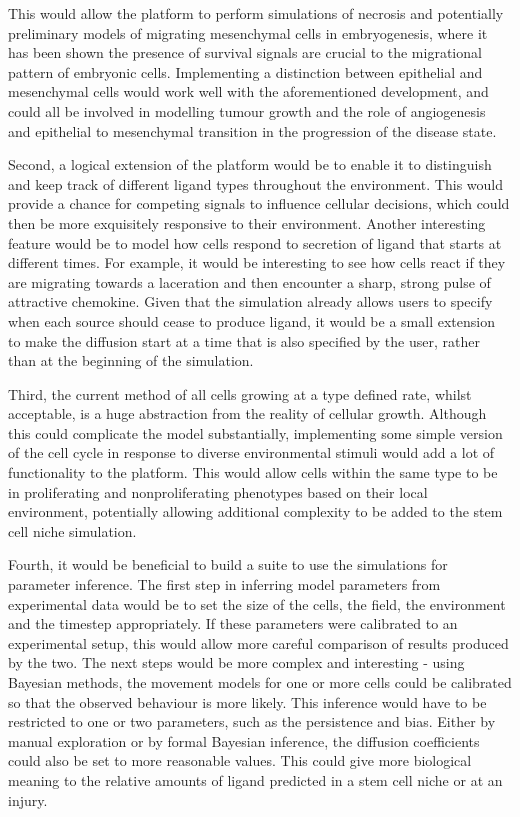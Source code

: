 \documentclass[12pt]{article}
\begin{document}
This would allow the platform to perform simulations of necrosis and 
potentially preliminary models of migrating mesenchymal cells in 
embryogenesis, where it has been shown the presence of survival signals 
are crucial to the migrational pattern of embryonic cells.\cite{raz09} Implementing 
a distinction between epithelial and mesenchymal cells would work well 
with the aforementioned development, and could all be involved in 
modelling tumour growth and the role of angiogenesis and epithelial to 
mesenchymal transition in the progression of the disease state.

Second, a logical extension of the platform would be to enable it to 
distinguish and keep track of different ligand types throughout the 
environment. This would provide a chance for competing signals to 
influence cellular decisions, which could then be more exquisitely 
responsive to their environment. Another interesting feature would be to 
model how cells respond to secretion of ligand that starts at different 
times. For example, it would be interesting to see how cells react
if they are migrating towards a laceration and then encounter a 
sharp, strong pulse of attractive chemokine. Given that 
the simulation already allows users to specify when each source should 
cease to produce ligand, it would be a small extension to make the 
diffusion start at a time that is also specified by the user, rather 
than at the beginning of the simulation. 

Third, the current method of all cells growing at a type defined rate, 
whilst acceptable, is a huge abstraction from the reality of cellular 
growth. Although this could complicate the model substantially, 
implementing some simple version of the cell cycle in response to 
diverse environmental stimuli would add a lot of functionality to the 
platform. This would allow cells within the same type to be in 
proliferating and nonproliferating phenotypes based on their local 
environment, potentially allowing additional complexity to be added to 
the stem cell niche simulation.

Fourth, it would be beneficial to build a suite to use the simulations 
for parameter inference. The first step in inferring model parameters 
from experimental data would be to set the size of the cells, the field, 
the environment and the timestep appropriately. If these parameters were 
calibrated to an experimental setup, this would allow more careful 
comparison of results produced by the two. The next steps would be more 
complex and interesting - using Bayesian methods, the movement models 
for one or more cells could be calibrated so that the observed behaviour 
is more likely. This inference would have to be restricted to one or two 
parameters, such as the persistence and bias. Either by manual 
exploration or by formal Bayesian inference, the diffusion coefficients 
could also be set to more reasonable values. This could give more 
biological meaning to the relative amounts of ligand predicted in a stem 
cell niche or at an injury.
\end{document}
